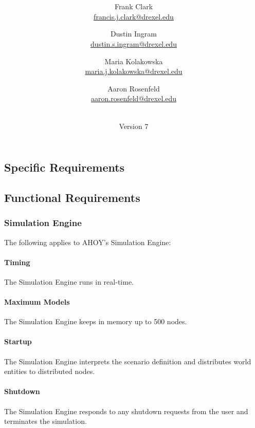 \documentclass[titlepage]{article}
\title{\textbf{\mytitle}}
\author{
	Frank Clark \\\url{francis.j.clark@drexel.edu}
    \and Dustin Ingram \\\url{dustin.s.ingram@drexel.edu}
	\and Maria Kolakowska \\\url{maria.j.kolakowska@drexel.edu}
    \and Aaron Rosenfeld \\\url{aaron.rosenfeld@drexel.edu}
}
\date{\mydate\\Version 7}
\newcommand{\cbox}[0]{
    \CheckBox[height=5pt,width=5pt]{}
}
\begin{document}

\begin{figure}
    \centering
    \scalebox{0.8}{}
    \vspace{-4em}
\end{figure}

\maketitle

\setcounter{tocdepth}{4}
\pagebreak
\pagebreak
{}


\begin{Form}

\section{Specific Requirements%
  \label{specific-requirements}%
}

\subsection{Functional Requirements%
    \label{functional}%
}

\subsubsection{Simulation Engine}
	The following applies to AHOY's Simulation Engine:
    \paragraph{Timing} The Simulation Engine runs in real-time.\cbox
    \paragraph{Maximum Models} The Simulation Engine keeps in memory up to 500 nodes.\cbox
    \paragraph{Startup} The Simulation Engine interprets the scenario definition and distributes world entities to distributed nodes.\cbox
    \paragraph{Shutdown} The Simulation Engine responds to any shutdown requests from the user and terminates the simulation.\cbox


\end{Form}
\end{document}
